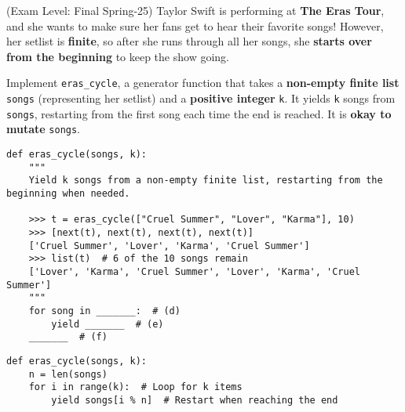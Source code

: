 \begin{blocksection}
\question(Exam Level: Final Spring-25) Taylor Swift is performing at \textbf{The Eras Tour}, and she wants to make sure her fans get to hear their favorite songs! However, her setlist is \textbf{finite}, so after she runs through all her songs, she \textbf{starts over from the beginning} to keep the show going.

Implement \texttt{eras\_cycle}, a generator function that takes a \textbf{non-empty finite list} \texttt{songs} (representing her setlist) and a \textbf{positive integer} \texttt{k}. It yields \texttt{k} songs from \texttt{songs}, restarting from the first song each time the end is reached. It is \textbf{okay to mutate} \texttt{songs}.

\begin{lstlisting}
def eras_cycle(songs, k):
    """
    Yield k songs from a non-empty finite list, restarting from the beginning when needed.

    >>> t = eras_cycle(["Cruel Summer", "Lover", "Karma"], 10)
    >>> [next(t), next(t), next(t), next(t)]
    ['Cruel Summer', 'Lover', 'Karma', 'Cruel Summer']
    >>> list(t)  # 6 of the 10 songs remain
    ['Lover', 'Karma', 'Cruel Summer', 'Lover', 'Karma', 'Cruel Summer']
    """
    for song in _______:  # (d)
        yield _______  # (e)
    _______  # (f)
\end{lstlisting}
\end{blocksection}

\begin{blocksection}
\begin{solution}[0in]

\begin{lstlisting}
def eras_cycle(songs, k):
    n = len(songs)
    for i in range(k):  # Loop for k items
        yield songs[i % n]  # Restart when reaching the end
\end{lstlisting}

\end{solution}
\end{blocksection}